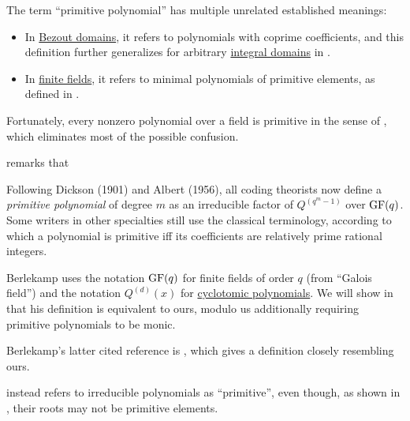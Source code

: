 \begin{remark}\label{rem:primitive_polynomial_terminology}
  The term \enquote{primitive polynomial} has multiple unrelated established meanings:
  \begin{itemize}
    \item In \hyperref[def:bezout_domain]{Bezout domains}, it refers to polynomials with coprime coefficients, and this definition further generalizes for arbitrary \hyperref[def:integral_domain]{integral domains} in .

    \item In \hyperref[def:finite_field]{finite fields}, it refers to minimal polynomials of primitive elements, as defined in .
  \end{itemize}

  Fortunately, every nonzero polynomial over a field is primitive in the sense of , which eliminates most of the possible confusion.

   remarks that
  \begin{displayquote}
    Following Dickson (1901) and Albert (1956), all coding theorists now define a \textit{primitive polynomial} of degree \( m \) as an irreducible factor of \( Q^{(q^m - 1)} \) over \( \op{GF}(q) \). Some writers in other specialties still use the classical terminology, according to which a polynomial is primitive iff its coefficients are relatively prime rational integers.
  \end{displayquote}

  Berlekamp uses the notation \( \op{GF}(q) \) for finite fields of order \( q \) (from \enquote{Galois field}) and the notation \( Q^{(d)}(x) \) for \hyperref[def:cyclotomic_polynomial]{cyclotomic polynomials}. We will show in  that his definition is equivalent to ours, modulo us additionally requiring primitive polynomials to be monic.

  Berlekamp's latter cited reference is \cite{Albert1956HigherAlgebra}, which gives a definition closely resembling ours.

   instead refers to irreducible polynomials as \enquote{primitive}, even though, as shown in , their roots may not be primitive elements.
\end{remark}

